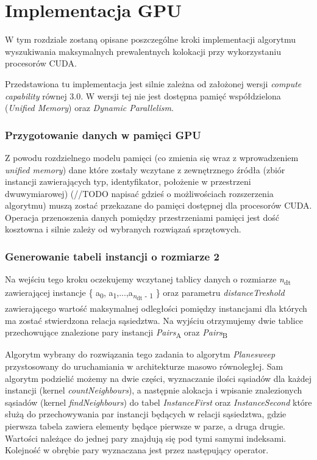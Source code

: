\documentclass[12pt]{article}
\newcounter{operator}
\newcounter{algorytm}
\begin{document}
\newpage

\section{Implementacja GPU}
\label{sec:gpu}
W tym rozdziale zostaną opisane poszczególne kroki implementacji algorytmu wyszukiwania maksymalnych prewalentnych kolokacji przy wykorzystaniu procesorów CUDA. 

Przedstawiona tu implementacja jest silnie zależna od założonej wersji \textit{compute capability} równej 3.0. W wersji tej nie jest dostępna pamięć współdzielona (\textit{Unified Memory}\cite{cuda_um}) oraz \textit{Dynamic Parallelism}\cite{cuda_dp}.

\subsubsection{Przygotowanie danych w pamięci GPU}

Z powodu rozdzielnego modelu pamięci (co zmienia się wraz z wprowadzeniem \textit{unified memory}) dane które zostały wczytane z zewnętrznego źródła (zbiór instancji zawierających typ, identyfikator, położenie w przestrzeni dwuwymiarowej) (//TODO napisać gdzieś o możliwościach rozszerzenia algorytmu) muszą zostać przekazane do pamięci dostępnej dla procesorów CUDA. Operacja przenoszenia danych pomiędzy przestrzeniami pamięci jest dość kosztowna i silnie zależy od wybranych rozwiązań sprzętowych.

\subsubsection{Generowanie tabeli instancji o rozmiarze 2}

Na wejściu tego kroku oczekujemy wczytanej tablicy danych o rozmiarze \textit{n}\textsubscript{dt} zawierającej instancje \{ a\textsubscript{0}, a\textsubscript{1},...,a\textsubscript{\textit{n}\textsubscript{dt} - 1} \} oraz parametru \textit{distanceTreshold} zawierającego wartość maksymalnej odległości pomiędzy instancjami dla których ma zostać stwierdzona relacja sąsiedztwa. Na wyjściu otrzymujemy dwie tablice przechowujące znalezione pary instancji \textit{Pairs}\textsubscript{A} oraz \textit{Pairs}\textsubscript{B}


Algorytm wybrany do rozwiązania tego zadania to algorytm \textit{Planesweep} przystosowany do uruchamiania w architekturze masowo równoległej. Sam algorytm podzielić możemy na dwie części, wyznaczanie ilości sąsiadów dla każdej instancji (kernel \textit{countNeighbours}), a następnie alokacja i wpisanie znalezionych sąsiadów (kernel \textit{findNeighbours}) do tabel \textit{InstanceFirst} oraz \textit{InstanceSecond} które służą do przechowywania par instancji będących w relacji sąsiedztwa, gdzie pierwsza tabela zawiera elementy będące pierwsze w parze, a druga drugie. Wartości należące do jednej pary znajdują się pod tymi samymi indeksami. Kolejność w obrębie pary wyznaczana jest przez następujący operator.
\end{document}
